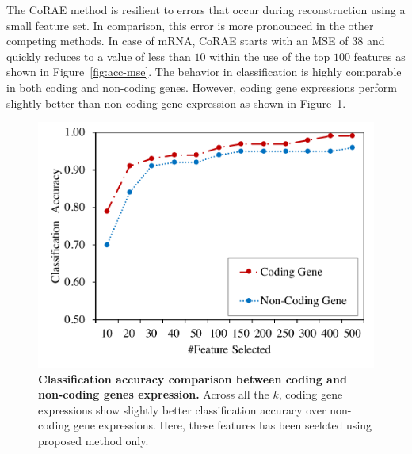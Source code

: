 \documentclass{bioinfo}
\begin{document}
The CoRAE method is resilient to errors that occur during reconstruction using a small feature set. In comparison, this error is more pronounced in the other competing methods.
In case of mRNA, CoRAE starts with an MSE of $38$ and quickly reduces to a value of less than $10$ within the use of the top $100$ features as shown in Figure~\ref{fig:acc-mse}. 
The behavior in classification is highly comparable in both coding and non-coding genes.
However, coding gene expressions perform slightly better than non-coding gene expression as shown in Figure~\ref{fig:acc-mRNA-lncRNA}.
  \begin{figure}[hbt]
    \centering
    \includegraphics[scale=0.45]{fig/acc-mRNA-lncRNA.pdf}
    \caption{\textbf{Classification accuracy comparison between coding and non-coding genes expression.} Across all the $k$, coding gene expressions show slightly better classification accuracy over non-coding gene expressions. Here, these features has been seelcted using proposed method only.}
    \label{fig:acc-mRNA-lncRNA}
\end{figure}
\end{document}
